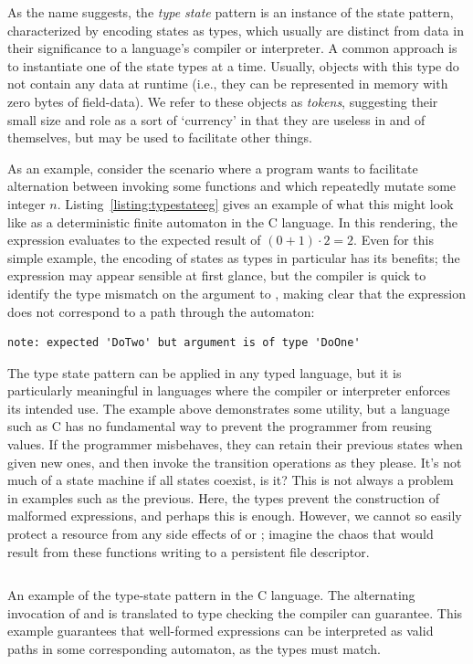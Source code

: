 As the name suggests, the \textit{type state} pattern is an instance of the state pattern, characterized by encoding states as types, which usually are distinct from data in their significance to a language's compiler or interpreter. A common approach is to instantiate one of the state types at a time. Usually, objects with this type do not contain any data at runtime (i.e., they can be represented in memory with zero bytes of field-data). We refer to these objects as \textit{tokens}, suggesting their small size and role as a sort of `currency' in that they are useless in and of themselves, but may be used to facilitate other things.

As an example, consider the scenario where a program wants to facilitate alternation between invoking some functions  and  which repeatedly mutate some integer $n$. Listing~\ref{listing:typestateeg} gives an example of what this might look like as a deterministic finite automaton in the C language. In this rendering, the expression  evaluates to the expected result of $(0 + 1) \cdot{} 2 = 2$. Even for this simple example, the encoding of states as types in particular has its benefits; the expression  may appear sensible at first glance, but the compiler is quick to identify the type mismatch on the argument to , making clear that the expression does not correspond to a path through the automaton:
\begin{verbatim}
note: expected 'DoTwo' but argument is of type 'DoOne'
\end{verbatim}

The type state pattern can be applied in any typed language, but it is particularly meaningful in languages where the compiler or interpreter enforces its intended use. The example above demonstrates some utility, but a language such as C has no fundamental way to prevent the programmer from reusing values. 
If the programmer misbehaves, they can retain their previous states when given new ones, and then invoke the transition operations as they please. It's not much of a state machine if all states coexist, is it? This is not always a problem in examples such as the previous. Here, the types prevent the construction of malformed expressions, and perhaps this is enough. However, we cannot so easily protect a resource from any side effects of  or ; imagine the chaos that would result from these functions writing to a persistent file descriptor.
\begin{listing}[ht]
	\inputminted[linenos,tabsize=2,breaklines,frame=lines]{c}{typestate_e.g.,c}
	\caption[Type state automaton in C with expressions modeling runs.]{An example of the type-state pattern in the C language. The alternating invocation of  and  is translated to type checking the compiler can guarantee. This example guarantees that well-formed expressions can be interpreted as valid paths in some corresponding automaton, as the types must match.}
	\label{listing:typestateeg}
\end{listing}

